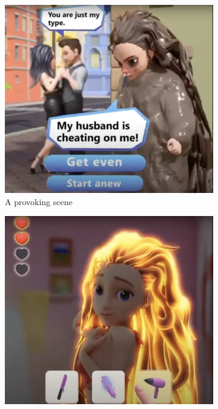\documentclass[a4paper, 12pt, mla]{homework}
\begin{document}
\begin{figure}[bt]\centering
	\begin{subfigure}[t]{0.3\linewidth}\centering
		\includegraphics[width=\linewidth]{PM-Drama.png}
		\caption{A provoking scene}
		\label{FIG:PM-Drama}
	\end{subfigure}
	\begin{subfigure}[t]{0.3\linewidth}\centering
		\includegraphics[width=\linewidth]{PM-Puzzle.png}

\end{subfigure}
\end{figure}
\end{document}
